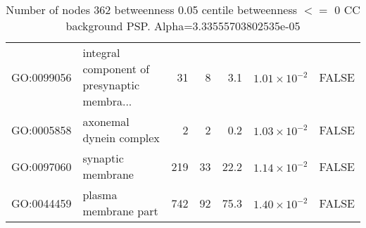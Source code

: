 \begin{table}[ht]
\begin{adjustbox}{max width=\textwidth}
\begin{tabular}{llrrrrl}
  GO:0099056 & integral component of presynaptic membra... & 31 & 8 & 3.1 & $1.01 \times 10^{-2}$ & FALSE \\ 
  GO:0005858 & axonemal dynein complex & 2 & 2 & 0.2 & $1.03 \times 10^{-2}$ & FALSE \\ 
  GO:0097060 & synaptic membrane & 219 & 33 & 22.2 & $1.14 \times 10^{-2}$ & FALSE \\ 
  GO:0044459 & plasma membrane part & 742 & 92 & 75.3 & $1.40 \times 10^{-2}$ & FALSE \\ 
   \hline
\end{tabular}
\end{adjustbox}
\caption{Number of nodes 362 betweenness 0.05 centile  betweenness $<=$ 0 CC background PSP. Alpha=3.33555703802535e-05} 
\label{tab:Number of nodes 362 betweenness 0.05 centile  betweenness $<=$ 0 CC background PSP. Alpha=3.33555703802535e-05}
\end{table}



